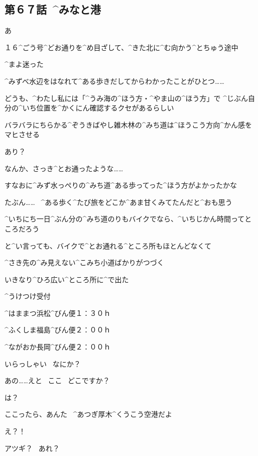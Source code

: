 \subsection{第６７話\ ^{みなと}{港}}

\page[20]
\Alpha あ

\Alpha １６^{ごう}{号}^{どお}{通}りを^{め}{目}ざして、^{きた}{北}に^{む}{向}かう^{とちゅう}{途中}

\Alpha ^{まよ}{迷}った

\page[21]
\Alpha ^{みずべ}{水辺}をはなれて^{ある}{歩}きだしてからわかったことがひとつ……

\Alpha どうも、^{わたし}{私}には「^{うみ}{海}の^{ほう}{方}・^{やま}{山}の^{ほう}{方}」で
^{じぶん}{自分}の^{いち}{位置}を^{かくにん}{確認}するクセがあるらしい

\Alpha バラバラにちらかる^{ぞうきばやし}{雑木林}の^{みち}{道}は^{ほうこう}{方向}^{かん}{感}をマヒさせる

\page[22]
\Alpha あり？

\Alpha なんか、さっき^{とお}{通}ったような……

\Alpha すなおに^{みず}{水}っぺりの^{みち}{道}^{ある}{歩}ってった^{ほう}{方}がよかったかな

\page[23]
\Alpha たぶん……
\ ^{ある}{歩}く^{たび}{旅}をどこか^{あま}{甘}くみてたんだと^{おも}{思}う

\Alpha ^{いちにち}{一日}^{ぶん}{分}の^{みち}{道}のりもバイクでなら、^{いちじかん}{時間}ってところだろう

\page[24]
\Alpha と^{い}{言}っても、バイクで^{とお}{通}れる^{ところ}{所}もほとんどなくて

\Alpha ^{さき}{先}の^{み}{見}えない^{こみち}{小道}ばかりがつづく

\page[29]
\Alpha いきなり^{ひろ}{広}い^{ところ}{所}に^{で}{出}た

\page[30]
\Sign ^{うけつけ}{受付}

\Sign ^{はままつ}{浜松}^{びん}{便}１：３０ｈ

\Sign ^{ふくしま}{福島}^{びん}{便}２：００ｈ

\Sign ^{ながおか}{長岡}^{びん}{便}２：００ｈ

\Person いらっしゃい
\ なにか？

\Alpha あの……えと
\ ここ
\ どこですか？

\Person は？

\page[31]
\Person ここったら、あんた
\ ^{あつぎ}{厚木}^{くうこう}{空港}だよ

\Alpha え？！

\Alpha アツギ？
\ あれ？

